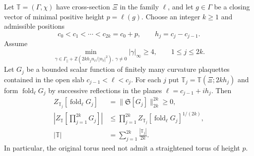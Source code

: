 \documentclass[11pt,letterpaper,reqno]{amsart}
\newcommand{\Z}{\mathbb Z}
\begin{document}
\begin{proposition}\label{prop:unequal-slabs}
Let $\mathbb T=(\Gamma,\chi)$ have cross-section $\Xi$ in the family
$\ell$, and let $g\in\Gamma$ be a closing vector of minimal positive
height $p=\ell(g)$. Choose an integer $k\ge1$ and admissible positions
\[
 c_0<c_1<\cdots<c_{2k}=c_0+p,\qquad h_j=c_j-c_{j-1}.
\]
Assume
\begin{equation}\label{eq:sides-systole}
 \min_{\gamma\in\Gamma_\parallel+
       \Z(2kh_j n_\ell/|n_\ell|^2),\ \gamma\ne0}
       |\gamma|_\infty\ge4,\qquad 1\le j\le2k.
\end{equation}
Let $G_j$ be a bounded scalar function of finitely many curvature
plaquettes contained in the open slab $c_{j-1}<\ell<c_j$.
For each $j$ put $\mathbb T_j=\mathbb T(\Xi;2kh_j)$ and form
$\operatorname{fold}_\ell G_j$ by successive reflections in the
planes $\ell=c_{j-1}+ih_j$. Then
\begin{align}
 Z_{\mathbb T_j}[\operatorname{fold}_\ell G_j]
   &=\|\mathfrak S[G_j]\|_{2k}^{2k}\ge0,
       \label{eq:sides-slab-norm}\\
 \left|Z_{\mathbb T}\left[\prod_{j=1}^{2k}G_j\right]\right|
   &\le\prod_{j=1}^{2k}
       Z_{\mathbb T_j}[\operatorname{fold}_\ell G_j]^{1/(2k)},
       \label{eq:sides-holder}\\
 |\mathbb T|&=\sum_{j=1}^{2k}\frac{|\mathbb T_j|}{2k}.
       \label{eq:sides-volumes}
\end{align}
In particular, the original torus need not admit a straightened torus
of height $p$.
\end{proposition}
\end{document}
